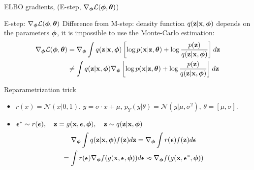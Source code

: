 \begin{frame}{ELBO gradients, (E-step, $\nabla_{\boldsymbol{\phi}} \mathcal{L}(\boldsymbol{\phi}, \boldsymbol{\theta})$)}
	\begin{block}{E-step: $\nabla_{\boldsymbol{\phi}} \mathcal{L}(\boldsymbol{\phi}, \boldsymbol{\theta})$}
		Difference from M-step: density function $q(\mathbf{z}| \mathbf{x}, \boldsymbol{\phi})$ depends on the parameters $\boldsymbol{\phi}$, it is impossible to use the Monte-Carlo estimation:
		\begin{align*}
			\nabla_{\boldsymbol{\phi}} \mathcal{L} (\boldsymbol{\phi}, \boldsymbol{\theta}) &= \nabla_{\boldsymbol{\phi}} \int q(\mathbf{z} | \mathbf{x}, \boldsymbol{\phi}) \left[\log p(\mathbf{x} | \mathbf{z}, \boldsymbol{\theta}) + \log \frac{p(\mathbf{z})}{q(\mathbf{z}| \mathbf{x}, \boldsymbol{\phi})} \right] d \mathbf{z} \\
			& \neq  \int q(\mathbf{z} | \mathbf{x}, \boldsymbol{\phi}) \nabla_{\boldsymbol{\phi}} \left[\log p(\mathbf{x} | \mathbf{z}, \boldsymbol{\theta}) + \log \frac{p(\mathbf{z})}{q(\mathbf{z}| \mathbf{x}, \boldsymbol{\phi})} \right] d \mathbf{z} 
		\end{align*}
	\end{block}
	\vspace{-0.5cm}
	\begin{block}{Reparametrization trick} 
		\begin{itemize}
			\item $r(x) = \mathcal{N}(x|0, 1)$, $y = \sigma \cdot x + \mu$, $p_Y(y|\theta) = \mathcal{N}(y| \mu, \sigma^2)$, $\theta = [\mu, \sigma]$.
			
			\item $\boldsymbol{\epsilon}^* \sim r(\boldsymbol{\epsilon}), \quad \mathbf{z} = g(\mathbf{x}, \boldsymbol{\epsilon}, \boldsymbol{\phi}), \quad \mathbf{z} \sim q(\mathbf{z} | \mathbf{x}, \boldsymbol{\phi})$
			\vspace{-0.3cm}
			\begin{multline*}
				\nabla_{\boldsymbol{\phi}}\int q(\mathbf{z}|\mathbf{x}, \boldsymbol{\phi}) f(\mathbf{z}) d\mathbf{z} = \nabla_{\boldsymbol{\phi}}\int r(\boldsymbol{\epsilon})  f(\mathbf{z}) d\boldsymbol{\epsilon} \\ = \int r(\boldsymbol{\epsilon}) \nabla_{\boldsymbol{\phi}} f(g(\mathbf{x}, \boldsymbol{\epsilon}, \boldsymbol{\phi})) d\boldsymbol{\epsilon} \approx \nabla_{\boldsymbol{\phi}} f(g(\mathbf{x}, \boldsymbol{\epsilon}^*, \boldsymbol{\phi}))
			\end{multline*}
		\end{itemize}
	\end{block}
\end{frame}
